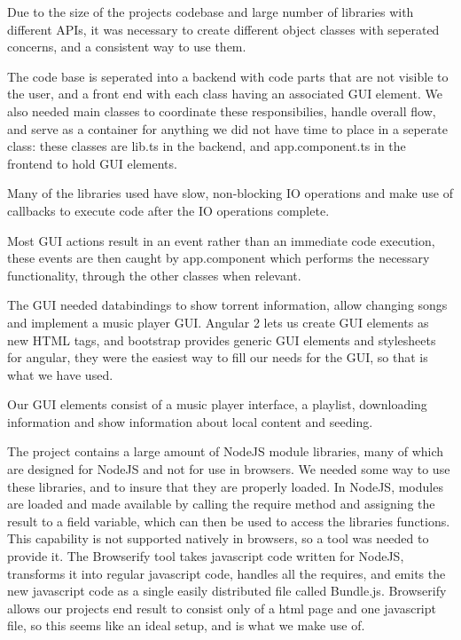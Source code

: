 Due to the size of the projects codebase and large number of libraries with different APIs, 
it was necessary to create different object classes with seperated concerns,
and a consistent way to use them.
\newline

The code base is seperated into a backend with code parts that are not visible to the user,
and a front end with each class having an associated GUI element.
We also needed main classes to coordinate these responsibilies, handle overall flow,
and serve as a container for anything we did not have time to place in a seperate class:
these classes are lib.ts in the backend,
and app.component.ts in the frontend to hold GUI elements.

Many of the libraries used have slow, non-blocking IO operations
and make use of callbacks to execute code after the IO operations complete.

Most GUI actions result in an event rather than an immediate code execution, 
these events are then caught by app.component
which performs the necessary functionality, through the other classes when relevant.
\newline

The GUI needed databindings to show torrent information, allow changing songs
and implement a music player GUI. 
Angular 2 lets us create GUI elements as new HTML tags, 
and bootstrap provides generic GUI elements and stylesheets for angular, 
they were the easiest way to fill our needs for the GUI,
so that is what we have used.

Our GUI elements consist of a music player interface, a playlist, downloading information 
and show information about local content and seeding.
\newline

The project contains a large amount of NodeJS module libraries, 
many of which are designed for NodeJS and not for use in browsers.
We needed some way to use these libraries, and to insure that they are properly loaded.
In NodeJS, modules are loaded and made available by calling the require method 
and assigning the result to a field variable, which can then be used to access the libraries functions.
This capability is not supported natively in browsers, so a tool was needed to provide it.
The Browserify tool takes javascript code written for NodeJS, 
transforms it into regular javascript code, 
handles all the requires, 
and emits the new javascript code as a single easily distributed file called Bundle.js.
Browserify allows our projects end result to consist only of a html page and one javascript file, 
so this seems like an ideal setup, and is what we make use of.
\newline

